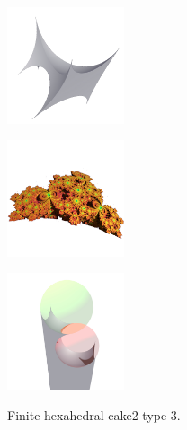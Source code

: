 \documentclass[suppldata, dvipdfmx]{interact}
\theoremstyle{plain}%
\theoremstyle{definition}
\theoremstyle{remark}
\theoremstyle{problemstyle}
\begin{document}
\begin{figure}[H]
 \begin{minipage}{0.5\textwidth}
  \begin{minipage}[t]{0.24\textwidth}
   \centering \includegraphics[width=1.35in, height=1.35in,
   keepaspectratio]{./img/sphairahedron/hexahedralCake2/sphairahedronFinite_c.jpg}
   \label{fig:cake2type3finiteSphairahedron}
  \end{minipage}
  \hspace*{\fill}
  \begin{minipage}[t]{0.24\textwidth}
   \centering
   \includegraphics[width=1.35in, height=1.35in,
   keepaspectratio]{./img/sphairahedron/hexahedralCake2/limitsetFinite_c.jpg}
   \label{fig:cake2type3finiteLimitset}
  \end{minipage}
  \hspace*{\fill}
  \caption{Finite hexahedral cake2 type 3.}
  \label{fig:cake2Type3finite}
 \end{minipage}
 \hspace*{\fill}
 \begin{minipage}{0.5\textwidth}
  \begin{minipage}[t]{0.24\textwidth}
   \centering
   \includegraphics[width=1.35in, height=1.35in,
   keepaspectratio]{./img/sphairahedron/hexahedralCake2/sphairahedronInf_c.jpg}
   \label{fig:cake2type3infiniteSphairahedron}

\end{minipage}
\end{minipage}
\end{figure}
\end{document}

